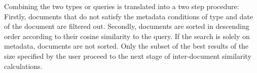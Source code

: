 Combining the two types or queries is translated into a two step procedure: Firstly, documents that do not satisfy the metadata conditions of type and date of the document are filtered out. Secondly, documents are sorted in descending order according to their cosine similarity to the query. If the search is solely on metadata, documents are not sorted. Only the subset of the best results of the size specified by the user proceed to the next stage of inter-document similarity calculations.

